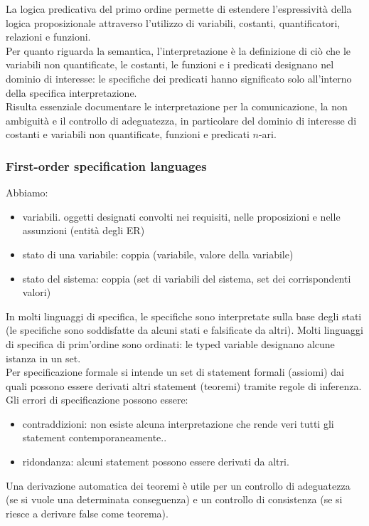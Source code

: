 La logica predicativa del primo ordine permette di estendere l’espressività della logica proposizionale attraverso l’utilizzo di variabili, costanti, quantificatori, relazioni e funzioni.\\
Per quanto riguarda la semantica, l’interpretazione è la definizione di ciò che le variabili non quantificate, le costanti, le funzioni e i predicati designano nel dominio di interesse: le specifiche dei predicati hanno significato solo all’interno della specifica interpretazione.\\
Risulta essenziale documentare le interpretazione per la comunicazione, la non ambiguità e il controllo di adeguatezza, in particolare del dominio di interesse di costanti e variabili non quantificate, funzioni e predicati $n$-ari.

\subsubsection{First-order specification languages}
Abbiamo:
\begin{itemize}
    \item variabili. oggetti designati convolti nei requisiti, nelle proposizioni e nelle assunzioni (entità degli ER)
    \item stato di una variabile: coppia (variabile, valore della variabile) 
    \item stato del sistema: coppia (set di variabili del sistema, set dei corrispondenti valori)
\end{itemize}
In molti linguaggi di specifica, le specifiche sono interpretate sulla base degli stati (le specifiche sono soddisfatte da alcuni stati e falsificate da altri).
Molti linguaggi di specifica di prim’ordine sono ordinati: le typed variable designano alcune istanza in un set.\\
Per specificazione formale si intende un set di statement formali (assiomi) dai quali possono essere derivati altri statement (teoremi) tramite regole di inferenza.
Gli errori di specificazione possono essere: 
\begin{itemize}
    \item contraddizioni: non esiste alcuna interpretazione che rende veri tutti gli statement contemporaneamente..
    \item ridondanza: alcuni statement possono essere derivati da altri.
\end{itemize}
Una derivazione automatica dei teoremi è utile per un controllo di adeguatezza (se si vuole una determinata conseguenza) e un controllo di consistenza (se si riesce a derivare false come teorema).
